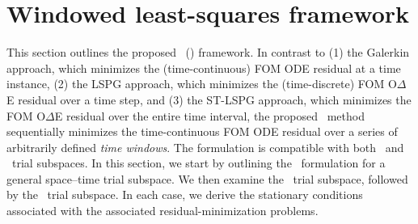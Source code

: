 \section{Windowed least-squares framework}\label{sec:tclspg} 
This section
outlines the proposed \methodNameLower\ 
(\methodAcronym) framework. In contrast to (1) the Galerkin approach, 
which minimizes the (time-continuous) FOM ODE residual at a time instance, 
(2) the LSPG approach, 
which minimizes
the (time-discrete) FOM O$\Delta$E residual 
over a time step, and (3) the ST-LSPG approach,  
which minimizes
the  FOM O$\Delta$E residual 
over the entire time interval, the proposed \methodAcronym\ method sequentially minimizes the 
time-continuous FOM ODE residual over a series of arbitrarily defined
\textit{time windows}. The formulation is compatible with both \spatialAcronym\ and \spaceTimeAcronym\ trial subspaces. 
In this section, we start by outlining the \methodAcronym\ formulation  
for a general space--time trial subspace. We then examine the \spatialAcronym\ 
trial subspace, followed by the \spaceTimeAcronym\ trial subspace. In each case, we derive the stationary conditions 
associated with the associated residual-minimization problems.

%
